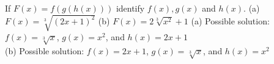 {If $F(x)=f(g(h(x)))$ identify $f(x), g(x)$ and $h(x)$.
(a) $F(x)=\sqrt[3]{(2x+1)^2}$ \qquad (b) $F(x)=2\sqrt[3]{x^2}+1$}
{(a) Possible solution: $f(x)=\sqrt[3]x$, $g(x)=x^2$, and $h(x)=2x+1$ \\
(b) Possible solution: $f(x)=2x+1$, $g(x)=\sqrt[3]x$, and $h(x)=x^2$}